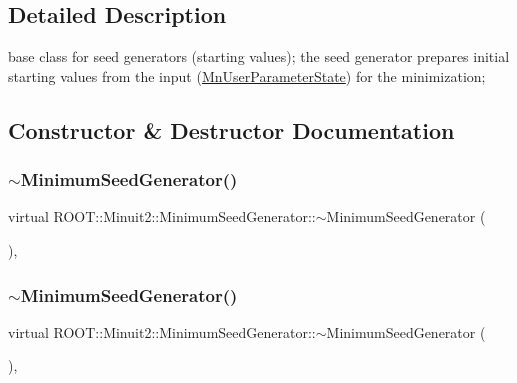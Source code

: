 \subsection{Detailed Description}
base class for seed generators (starting values); the seed generator prepares initial starting values from the input (\mbox{\hyperlink{classROOT_1_1Minuit2_1_1MnUserParameterState}{Mn\+User\+Parameter\+State}}) for the minimization; 

\subsection{Constructor \& Destructor Documentation}
\mbox{\label{classROOT_1_1Minuit2_1_1MinimumSeedGenerator_a8dba99d17a2ee712dfd6d602c80ec423}} 
\subsubsection{\texorpdfstring{$\sim$MinimumSeedGenerator()}{~MinimumSeedGenerator()}\hspace{0.1cm}{\footnotesize\ttfamily [1/2]}}
{\footnotesize\ttfamily virtual R\+O\+O\+T\+::\+Minuit2\+::\+Minimum\+Seed\+Generator\+::$\sim$\+Minimum\+Seed\+Generator (\begin{DoxyParamCaption}{ }\end{DoxyParamCaption})\hspace{0.3cm}{\ttfamily [inline]}, {\ttfamily [virtual]}}

\mbox{\label{classROOT_1_1Minuit2_1_1MinimumSeedGenerator_a8dba99d17a2ee712dfd6d602c80ec423}} 
\subsubsection{\texorpdfstring{$\sim$MinimumSeedGenerator()}{~MinimumSeedGenerator()}\hspace{0.1cm}{\footnotesize\ttfamily [2/2]}}
{\footnotesize\ttfamily virtual R\+O\+O\+T\+::\+Minuit2\+::\+Minimum\+Seed\+Generator\+::$\sim$\+Minimum\+Seed\+Generator (\begin{DoxyParamCaption}{ }\end{DoxyParamCaption})\hspace{0.3cm}{\ttfamily [inline]}, {\ttfamily [virtual]}}




